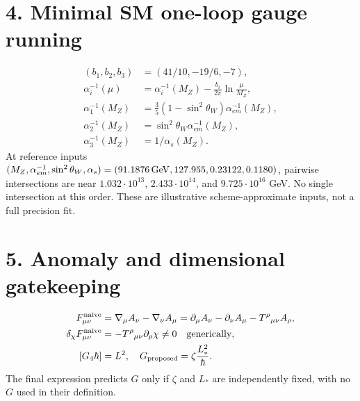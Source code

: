 \documentclass[11pt]{article}
\begin{document}
\section*{4. Minimal SM one-loop gauge running}
\begin{align}
 (b_1,b_2,b_3)&=(41/10,-19/6,-7),\\
 \alpha_i^{-1}(\mu)&=\alpha_i^{-1}(M_Z)-\frac{b_i}{2\pi}\ln\frac{\mu}{M_Z},\\
 \alpha_1^{-1}(M_Z)&=\tfrac 35(1-\sin^2\theta_W)\alpha_{em}^{-1}(M_Z),\\
 \alpha_2^{-1}(M_Z)&=\sin^2\theta_W\alpha_{em}^{-1}(M_Z),\\
 \alpha_3^{-1}(M_Z)&=1/\alpha_s(M_Z).
\end{align}
At reference inputs $(M_Z,\alpha_{em}^{-1},\sin^2\theta_W,\alpha_s)=(91.1876\,{\rm GeV},127.955,0.23122,0.1180)$,
pairwise intersections are near $1.032\cdot10^{13}$, $2.433\cdot10^{14}$, and $9.725\cdot10^{16}$ GeV. No single intersection at this order. These are illustrative scheme-approximate inputs, not a full precision fit.
\section*{5. Anomaly and dimensional gatekeeping}
\begin{align}
 F_{\mu\nu}^{\rm naive}&=\nabla_\mu A_\nu-\nabla_\nu A_\mu
 =\partial_\mu A_\nu-\partial_\nu A_\mu-T^\rho{}_{\mu\nu} A_\rho,\\
 \delta_\chi F_{\mu\nu}^{\rm naive}&=-T^\rho{}_{\mu\nu}\partial_\rho\chi\ne0\quad\text{generically},\\
 [G_4\hbar]&=L^2,\quad G_{\rm proposed}=\zeta\frac{L_*^2}{\hbar}.
\end{align}
The final expression predicts $G$ only if $\zeta$ and $L_*$ are independently fixed, with no $G$ used in their definition.
\end{document}
